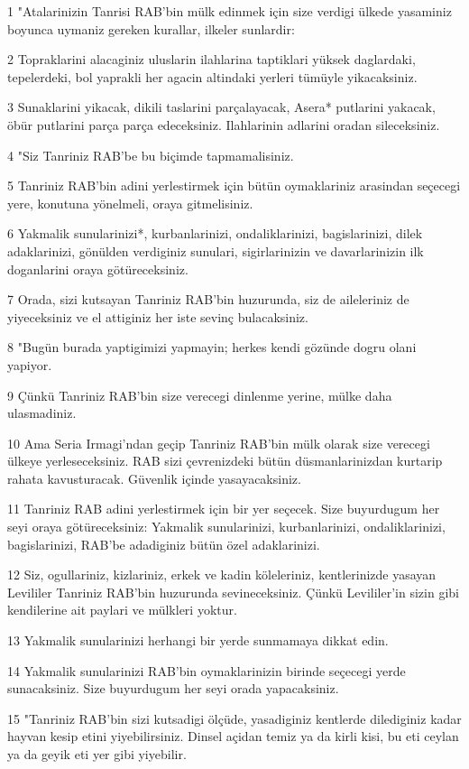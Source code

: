 \par 1 "Atalarinizin Tanrisi RAB'bin mülk edinmek için size verdigi ülkede yasaminiz boyunca uymaniz gereken kurallar, ilkeler sunlardir:
\par 2 Topraklarini alacaginiz uluslarin ilahlarina taptiklari yüksek daglardaki, tepelerdeki, bol yaprakli her agacin altindaki yerleri tümüyle yikacaksiniz.
\par 3 Sunaklarini yikacak, dikili taslarini parçalayacak, Asera* putlarini yakacak, öbür putlarini parça parça edeceksiniz. Ilahlarinin adlarini oradan sileceksiniz.
\par 4 "Siz Tanriniz RAB'be bu biçimde tapmamalisiniz.
\par 5 Tanriniz RAB'bin adini yerlestirmek için bütün oymaklariniz arasindan seçecegi yere, konutuna yönelmeli, oraya gitmelisiniz.
\par 6 Yakmalik sunularinizi*, kurbanlarinizi, ondaliklarinizi, bagislarinizi, dilek adaklarinizi, gönülden verdiginiz sunulari, sigirlarinizin ve davarlarinizin ilk doganlarini oraya götüreceksiniz.
\par 7 Orada, sizi kutsayan Tanriniz RAB'bin huzurunda, siz de aileleriniz de yiyeceksiniz ve el attiginiz her iste sevinç bulacaksiniz.
\par 8 "Bugün burada yaptigimizi yapmayin; herkes kendi gözünde dogru olani yapiyor.
\par 9 Çünkü Tanriniz RAB'bin size verecegi dinlenme yerine, mülke daha ulasmadiniz.
\par 10 Ama Seria Irmagi'ndan geçip Tanriniz RAB'bin mülk olarak size verecegi ülkeye yerleseceksiniz. RAB sizi çevrenizdeki bütün düsmanlarinizdan kurtarip rahata kavusturacak. Güvenlik içinde yasayacaksiniz.
\par 11 Tanriniz RAB adini yerlestirmek için bir yer seçecek. Size buyurdugum her seyi oraya götüreceksiniz: Yakmalik sunularinizi, kurbanlarinizi, ondaliklarinizi, bagislarinizi, RAB'be adadiginiz bütün özel adaklarinizi.
\par 12 Siz, ogullariniz, kizlariniz, erkek ve kadin köleleriniz, kentlerinizde yasayan Levililer Tanriniz RAB'bin huzurunda sevineceksiniz. Çünkü Levililer'in sizin gibi kendilerine ait paylari ve mülkleri yoktur.
\par 13 Yakmalik sunularinizi herhangi bir yerde sunmamaya dikkat edin.
\par 14 Yakmalik sunularinizi RAB'bin oymaklarinizin birinde seçecegi yerde sunacaksiniz. Size buyurdugum her seyi orada yapacaksiniz.
\par 15 "Tanriniz RAB'bin sizi kutsadigi ölçüde, yasadiginiz kentlerde dilediginiz kadar hayvan kesip etini yiyebilirsiniz. Dinsel açidan temiz ya da kirli kisi, bu eti ceylan ya da geyik eti yer gibi yiyebilir.
